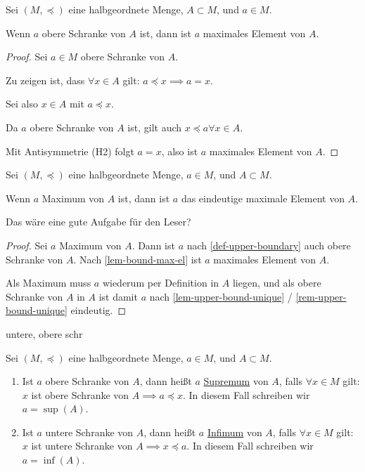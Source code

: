 \begin{lemma}[lemma]
    \label{lem-bound-max-el}
    Sei $(M, \preceq)$ eine halbgeordnete Menge, $A \subset M$, und $a \in M$.

    Wenn $a$ obere Schranke von $A$ ist, dann ist $a$ maximales Element von $A$.
\end{lemma}
\begin{proof}
    Sei $a \in M$ obere Schranke von $A$.
    
    Zu zeigen ist, dass $\forall x \in A$ gilt: $a \preceq x \implies a = x$.

    Sei also $x \in A$ mit $a \preceq x$.
    
    Da $a$ obere Schranke von $A$ ist, gilt auch $x \preceq a \forall x \in A$.

    Mit Antisymmetrie (H2) folgt $a = x$, also ist $a$ maximales Element von $A$.
\end{proof}

\begin{lemma}[lemma]
    \label{lem-maximum-max-el}
    Sei $(M, \preceq)$ eine halbgeordnete Menge, $a \in M$, und $A \subset M$.

    Wenn $a$ Maximum von $A$ ist, dann ist $a$ das eindeutige maximale Element von $A$.
\end{lemma}
\begin{query}
    Das wäre eine gute Aufgabe für den Leser?
\end{query}
\begin{proof}
    Sei $a$ Maximum von $A$. Dann ist $a$ nach \ref{def-upper-boundary} auch obere Schranke von $A$. Nach \ref{lem-bound-max-el} ist $a$ maximales Element von $A$.

    Als Maximum muss $a$ wiederum per Definition in $A$ liegen, und als obere Schranke von $A$ in $A$ ist damit $a$ nach \ref{lem-upper-bound-unique} / \ref{rem-upper-bound-unique} eindeutig.
\end{proof}

\begin{example}
    untere, obere schr
\end{example}

\begin{definition}
    Sei $(M, \preceq)$ eine halbgeordnete Menge, $a \in M$, und $A \subset M$.
    \begin{enumerate}
        \item Ist $a$ obere Schranke von $A$, dann heißt $a$ \underline{Supremum} von $A$, falls $\forall x \in M$ gilt: $x$ ist obere Schranke von $A \implies a \preceq x$. In diesem Fall schreiben wir $a = \sup(A)$.
        \item Ist $a$ untere Schranke von $A$, dann heißt $a$ \underline{Infimum} von $A$, falls $\forall x \in M$ gilt: $x$ ist untere Schranke von $A \implies x \preceq a$. In diesem Fall schreiben wir $a = \inf(A)$.
    \end{enumerate}
\end{definition}

